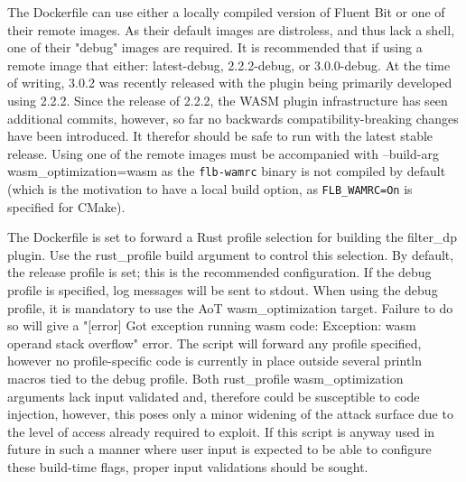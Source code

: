 The Dockerfile can use either a locally compiled version of Fluent Bit or one of their remote images. As their default images are distroless, and thus lack a shell, one of their "debug" images are required. It is recommended that if using a remote image that either: latest-debug, 2.2.2-debug, or 3.0.0-debug. At the time of writing, 3.0.2 was recently released with the plugin being primarily developed using 2.2.2. Since the release of 2.2.2, the WASM plugin infrastructure has seen additional commits, however, so far no backwards compatibility-breaking changes have been introduced. It therefor should be safe to run with the latest stable release. Using one of the remote images must be accompanied with --build-arg wasm\_optimization=wasm as the \texttt{flb-wamrc} binary is not compiled by default (which is the motivation to have a local build option, as \texttt{FLB\_WAMRC=On} is specified for CMake). 

The Dockerfile is set to forward a Rust profile selection for building the filter\_dp plugin. Use the rust\_profile build argument to control this selection. By default, the release profile is set; this is the recommended configuration. If the debug profile is specified, log messages will be sent to stdout. When using the debug profile, it is mandatory to use the AoT wasm\_optimization target. Failure to do so will give a "[error] Got exception running wasm code: Exception: wasm operand stack overflow" error. The script will forward any profile specified, however no profile-specific code is currently in place outside several println macros tied to the debug profile. Both rust\_profile wasm\_optimization arguments lack input validated and, therefore could be susceptible to code injection, however, this poses only a minor widening of the attack surface due to the level of access already required to exploit. If this script is anyway used in future in such a manner where user input is expected to be able to configure these build-time flags, proper input validations should be sought. 
